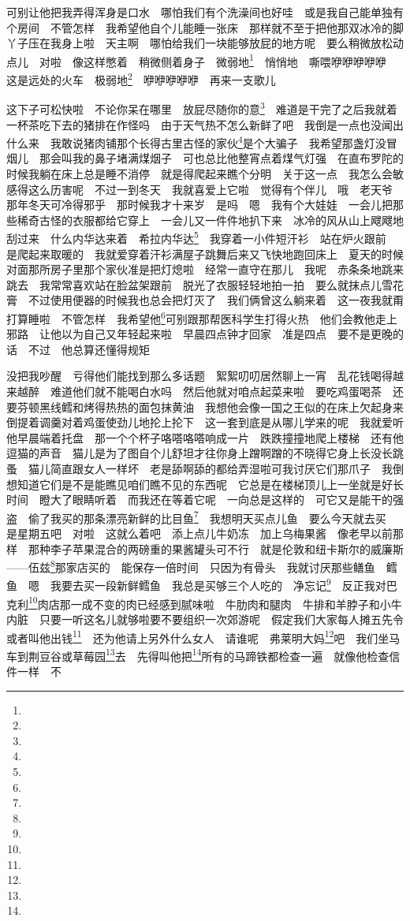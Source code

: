 \par 可别让他把我弄得浑身是口水　哪怕我们有个洗澡间也好哇　或是我自己能单独有个房间　不管怎样　我希望他自个儿能睡一张床　那样就不至于把他那双冰冷的脚丫子压在我身上啦　天主啊　哪怕给我们一块能够放屁的地方呢　要么稍微放松动点儿　对啦　像这样憋着　稍微侧着身子　微弱地\footnote{}　悄悄地　嘶喂咿咿咿咿咿　这是远处的火车　极弱地\footnote{}　咿咿咿咿咿　再来一支歌儿　
\par 这下子可松快啦　不论你呆在哪里　放屁尽随你的意\footnote{}　难道是干完了之后我就着一杯茶吃下去的猪排在作怪吗　由于天气热不怎么新鲜了吧　我倒是一点也没闻出什么来　我敢说猪肉铺那个长得古里古怪的家伙\footnote{}是个大骗子　我希望那盏灯没冒烟儿　那会叫我的鼻子堵满煤烟子　可也总比他整宵点着煤气灯强　在直布罗陀的时候我躺在床上总是睡不消停　就是得爬起来瞧个分明　关于这一点　我怎么会敏感得这么历害呢　不过一到冬天　我就喜爱上它啦　觉得有个伴儿　哦　老天爷　那年冬天可冷得邪乎　那时候我才十来岁　是吗　嗯　我有个大娃娃　一会儿把那些稀奇古怪的衣服都给它穿上　一会儿又一件件地扒下来　冰冷的风从山上飕飕地刮过来　什么内华达来着　希拉内华达\footnote{}　我穿着一小件短汗衫　站在炉火跟前　是爬起来取暖的　我就爱穿着汗衫满屋子跳舞后来又飞快地跑回床上　夏天的时候对面那所房子里那个家伙准是把灯熄啦　经常一直守在那儿　我呢　赤条条地跳来跳去　我常常喜欢站在脸盆架跟前　脱光了衣服轻轻地拍一拍　要么就抹点儿雪花膏　不过使用便器的时候我也总会把灯灭了　我们俩曾这么躺来着　这一夜我就甭打算睡啦　不管怎样　我希望他\footnote{}可别跟那帮医科学生打得火热　他们会教他走上邪路　让他以为自己又年轻起来啦　早晨四点钟才回家　准是四点　要不是更晚的话　不过　他总算还懂得规矩　
\par 没把我吵醒　亏得他们能找到那么多话题　絮絮叨叨居然聊上一宵　乱花钱喝得越来越醉　难道他们就不能喝白水吗　然后他就对咱点起菜来啦　要吃鸡蛋喝茶　还要芬顿黑线鳕和烤得热热的面包抹黄油　我想他会像一国之王似的在床上欠起身来　倒提着调羹对着鸡蛋使劲儿地抡上抡下　这一套到底是从哪儿学来的呢　我就爱听他早晨端着托盘　那一个个杯子咯嗒咯嗒响成一片　跌跌撞撞地爬上楼梯　还有他逗猫的声音　猫儿是为了图自个儿舒坦才往你身上蹭啊蹭的不晓得它身上长没长跳蚤　猫儿简直跟女人一样坏　老是舔啊舔的都给弄湿啦可我讨厌它们那爪子　我倒想知道它们是不是能瞧见咱们瞧不见的东西呢　它总是在楼梯顶儿上一坐就是好长时间　瞪大了眼睛听着　而我还在等着它呢　一向总是这样的　可它又是能干的强盗　偷了我买的那条漂亮新鲜的比目鱼\footnote{}　我想明天买点儿鱼　要么今天就去买　是星期五吧　对啦　这就么着吧　添上点儿牛奶冻　加上乌梅果酱　像老早以前那样　那种李子苹果混合的两磅重的果酱罐头可不行　就是伦敦和纽卡斯尔的威廉斯——伍兹\footnote{}那家店买的　能保存一倍时间　只因为有骨头　我就讨厌那些鳝鱼　鳕鱼　嗯　我要去买一段新鲜鳕鱼　我总是买够三个人吃的　净忘记\footnote{}　反正我对巴克利\footnote{}肉店那一成不变的肉已经感到腻味啦　牛肋肉和腿肉　牛排和羊脖子和小牛内脏　只要一听这名儿就够啦要不要组织一次郊游呢　假定我们大家每人摊五先令　或者叫他出钱\footnote{}　还为他请上另外什么女人　请谁呢　弗莱明大妈\footnote{}吧　我们坐马车到荆豆谷或草莓园\footnote{}去　先得叫他把\footnote{}所有的马蹄铁都检查一遍　就像他检查信件一样　不　
